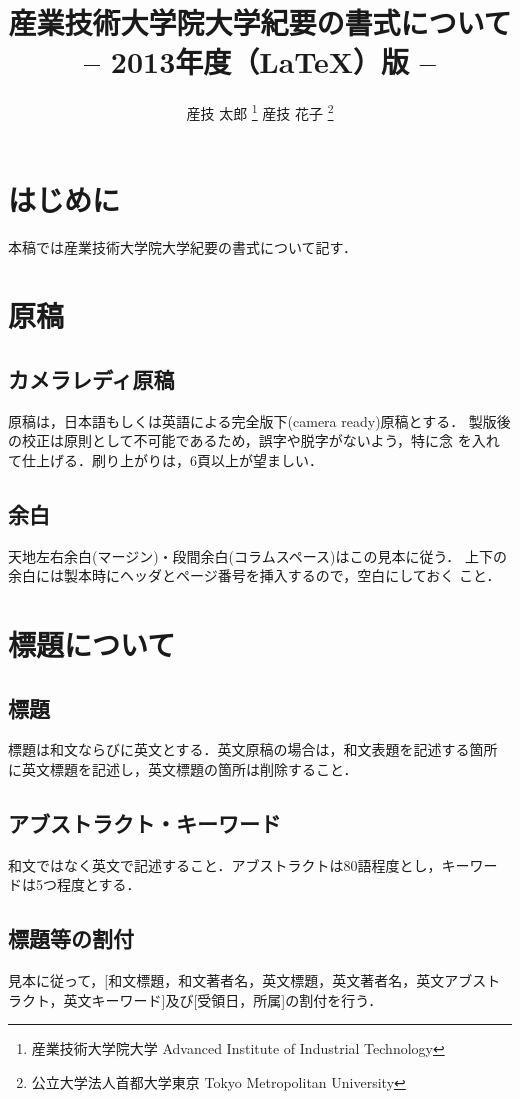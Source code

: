 \documentclass[a4j, 12Q, twocolumn, twoside]{jsarticle}
\title{産業技術大学院大学紀要の書式について\\-- 2013年度（\LaTeX）版 --}
\author{
  産技 太郎
  \thanks{産業技術大学院大学 \newline
  Advanced Institute of Industrial Technology}
  産技 花子
  \thanks{公立大学法人首都大学東京 \newline
  Tokyo Metropolitan University}
}
\begin{document}
\amaketitle[-1pt]

\section{はじめに}
本稿では産業技術大学院大学紀要の書式について記す．

\section{原稿}
\subsection{カメラレディ原稿}
原稿は，日本語もしくは英語による完全版下(camera ready)原稿とする．
製版後の校正は原則として不可能であるため，誤字や脱字がないよう，特に念
を入れて仕上げる．刷り上がりは，6頁以上が望ましい．

\subsection{余白}
天地左右余白(マージン)・段間余白(コラムスペース)はこの見本に従う．
上下の余白には製本時にヘッダとページ番号を挿入するので，空白にしておく
こと．

\section{標題について}
\subsection{標題}
標題は和文ならびに英文とする．英文原稿の場合は，和文表題を記述する箇所
に英文標題を記述し，英文標題の箇所は削除すること．

\subsection{アブストラクト・キーワード}
和文ではなく英文で記述すること．アブストラクトは80語程度とし，キーワー
ドは5つ程度とする．

\subsection{標題等の割付}
見本に従って，[和文標題，和文著者名，英文標題，英文著者名，英文アブスト
ラクト，英文キーワード]及び[受領日，所属]の割付を行う．
\end{document}
